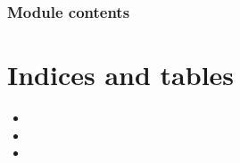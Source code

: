 \documentclass[letterpaper,10pt,english]{sphinxmanual}
\begin{document}
\begin{fulllineitems}
\label{\detokenize{xmmPipeline:xmmPipeline.rgsPipeline.strToBool}}
\pysigstartsignatures
{}
\pysigstopsignatures
\end{fulllineitems}



\subsection{Module contents}
\label{\detokenize{xmmPipeline:module-xmmPipeline}}\label{\detokenize{xmmPipeline:module-contents}}

\chapter{Indices and tables}
\label{\detokenize{index:indices-and-tables}}\begin{itemize}
\item {} 
\sphinxAtStartPar
{}

\item {} 
\sphinxAtStartPar
{}

\item {} 
\sphinxAtStartPar
{}

\end{itemize}
\end{document}
